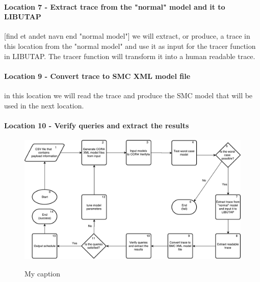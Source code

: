 \paragraph{Location 7 - Extract trace from the "normal" model and it to LIBUTAP} [find et andet navn end "normal model"] we will extract, or produce, a trace in this location from the "normal model" and use it as input for the tracer function in LIBUTAP. The tracer function will transform it into a human readable trace.

\paragraph{Location 9 - Convert trace to SMC XML model file} in this location we will read the trace and produce the SMC model that will be used in the next location.

\paragraph{Location 10 - Verify queries and extract the results} 

\begin{figure}
	\includegraphics[width=\textwidth]{graphics/tool_chain.pdf}
	\label{fig:tool_chain}
	\caption{My caption}
\end{figure}